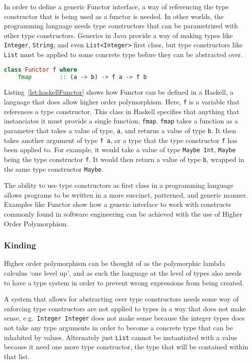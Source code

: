 In order to define a generic Functor interface, a way of referencing the type
constructor that is being used as a functor is needed. In other worlds, the
programming language needs type constructors that can be parametrized with
other type constructors. Generics in Java provide a way of making types like
\lstinline{Integer}, \lstinline{String}, and even \lstinline{List<Integer>}
first class, but type constructors like \lstinline{List} must be applied to
some concrete type before they can be abstracted over.

\begin{lstlisting}[caption=Functor as defined in Haskell., language=Haskell, label={lst:haskellFunctor}]
class Functor f where
    fmap        :: (a -> b) -> f a -> f b
\end{lstlisting}

Listing~\ref{lst:haskellFunctor} shows how Functor can be defined in a Haskell,
a language that does allow higher order polymorphism. Here, \lstinline{f} is a
variable that references a type constructor. This class in Haskell specifies
that anything that instanciates it must provide a single function,
\lstinline{fmap}.  \lstinline{fmap} takes a function as a parameter that takes
a value of type, \lstinline{a}, and returns a value of type \lstinline{b}. It
then takes another argument of type \lstinline{f a}, or a type that the type
constructor \lstinline{f} has been applied to. For example, it would take a
value of type \lstinline{Maybe Int}, \lstinline{Maybe} being the type
constructor \lstinline{f}. It would then return a value of type \lstinline{b},
wrapped in the same type constructor \lstinline{Maybe}.

The ability to use type constructors as first class in a programming language
allows programs to be written in a more succinct, patterned, and generic manner.
Examples like Functor show how a generic interface to work with constructs
commonly found in software engineering can be achieved with the use of Higher
Order Polymorphism.

\subsubsection{Kinding}

Higher order polymorphism can be thought of as the polymorphic lambda calculus
`one level up', and as such the language at the level of types also needs to 
have a type system in order to prevent wrong expressions from being created.

A system that allows for abstracting over type constructors needs some way
of enforcing type constructors are not applied to types in a way that does not
make sense, e.g.\ \lstinline{Integer Integer} does not make sense because the
integer types does not take any type arguments in order to become a concrete
type that can be inhabited by values. Alternately just \lstinline{List} cannot
be instantiated with a value because it need one more type constructor, 
the type that will be contained within that list.


